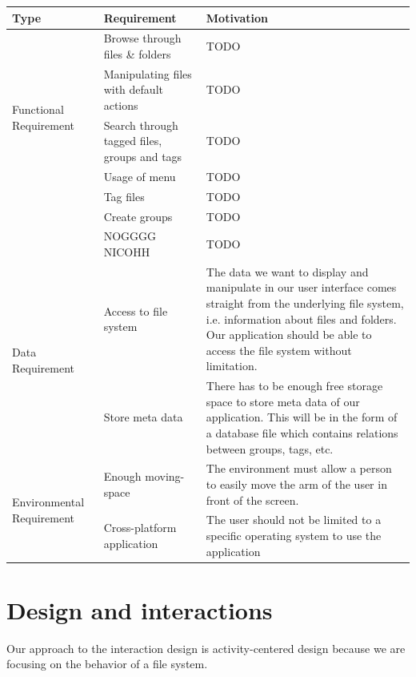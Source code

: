 \documentclass{article}
\begin{document}
\begin{center}
    \begin{tabular}{ | l | l | p{5cm} |}
    \hline
    Type & Requirement & Motivation 
		\\ \hline
		
    \multirow{5}{*}{Functional Requirement} 
		& Browse through files \& folders & TODO
		\\ \cline{2-3}
		& Manipulating files with default actions & TODO
		\\ \cline{2-3}
		& Search through tagged files, groups and tags & TODO
		\\ \cline{2-3}		
		& Usage of menu & TODO
		\\ \cline{2-3}
		& Tag files & TODO
		\\ \cline{2-3}
		& Create groups & TODO
		\\ \cline{2-3}
		& NOGGGG NICOHH & TODO
		\\ \hline		
		
    \multirow{2}{*}{Data Requirement} & Access to file system & The data we want to display and manipulate in our user interface comes straight from the underlying file system, i.e. information about files and folders. Our application should be able to access the file system without limitation. 
		\\ \cline{2-3}
		& Store meta data & There has to be enough free storage space to store meta data of our application. This will be in the form of a database file which contains relations between groups, tags, etc.
		\\ \hline

    \multirow{2}{*}{Environmental Requirement} & Enough moving-space & The environment must allow a person to easily move the arm of the user in front of the screen.
			\\ \cline{2-3}
		& Cross-platform application & The user should not be limited to a specific operating system to use the application
    \end{tabular}
\end{center}

\section{Design and interactions}

Our approach to the interaction design is activity-centered design because we are focusing on the behavior of a file system. 
\end{document}
